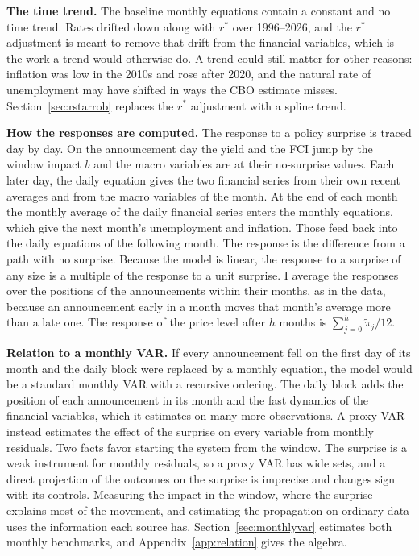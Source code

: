 \documentclass[11pt]{article}
\newcommand{\rs}{r^{*}}
\begin{document}
\textbf{The time trend.} The baseline monthly equations contain a constant and no time trend. Rates drifted down along with $\rs$ over 1996--2026, and the $\rs$ adjustment is meant to remove that drift from the financial variables, which is the work a trend would otherwise do. A trend could still matter for other reasons: inflation was low in the 2010s and rose after 2020, and the natural rate of unemployment may have shifted in ways the CBO estimate misses. Section~\ref{sec:rstarrob} replaces the $\rs$ adjustment with a spline trend.

\textbf{How the responses are computed.} The response to a policy surprise is traced day by day. On the announcement day the yield and the FCI jump by the window impact $b$ and the macro variables are at their no-surprise values. Each later day, the daily equation gives the two financial series from their own recent averages and from the macro variables of the month. At the end of each month the monthly average of the daily financial series enters the monthly equations, which give the next month's unemployment and inflation. Those feed back into the daily equations of the following month. The response is the difference from a path with no surprise. Because the model is linear, the response to a surprise of any size is a multiple of the response to a unit surprise. I average the responses over the positions of the announcements within their months, as in the data, because an announcement early in a month moves that month's average more than a late one. The response of the price level after $h$ months is $\sum_{j=0}^{h}\tilde\pi_j/12$.

\textbf{Relation to a monthly VAR.} If every announcement fell on the first day of its month and the daily block were replaced by a monthly equation, the model would be a standard monthly VAR with a recursive ordering. The daily block adds the position of each announcement in its month and the fast dynamics of the financial variables, which it estimates on many more observations. A proxy VAR instead estimates the effect of the surprise on every variable from monthly residuals. Two facts favor starting the system from the window. The surprise is a weak instrument for monthly residuals, so a proxy VAR has wide sets, and a direct projection of the outcomes on the surprise is imprecise and changes sign with its controls. Measuring the impact in the window, where the surprise explains most of the movement, and estimating the propagation on ordinary data uses the information each source has. Section~\ref{sec:monthlyvar} estimates both monthly benchmarks, and Appendix~\ref{app:relation} gives the algebra.
\end{document}
